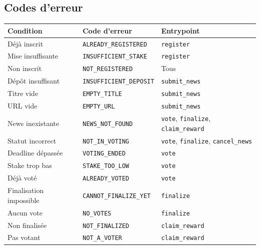 \documentclass[12pt,a4paper]{article}
\begin{document}
\subsection{Codes d'erreur}

\begin{table}[H]
\centering
\renewcommand{\arraystretch}{1.4}
\begin{tabular}{L{4.5cm} L{4.5cm} L{3.5cm}}
\toprule
{}
\textbf{Condition} & \textbf{Code d'erreur} & \textbf{Entrypoint} \\
\midrule
Déjà inscrit               & \texttt{ALREADY\_REGISTERED}   & \texttt{register} \\
Mise insuffisante          & \texttt{INSUFFICIENT\_STAKE}   & \texttt{register} \\
Non inscrit                & \texttt{NOT\_REGISTERED}       & Tous \\
Dépôt insuffisant          & \texttt{INSUFFICIENT\_DEPOSIT} & \texttt{submit\_news} \\
Titre vide                 & \texttt{EMPTY\_TITLE}          & \texttt{submit\_news} \\
URL vide                   & \texttt{EMPTY\_URL}            & \texttt{submit\_news} \\
News inexistante           & \texttt{NEWS\_NOT\_FOUND}      & \texttt{vote}, \texttt{finalize}, \texttt{claim\_reward} \\
Statut incorrect           & \texttt{NOT\_IN\_VOTING}       & \texttt{vote}, \texttt{finalize}, \texttt{cancel\_news} \\
Deadline dépassée          & \texttt{VOTING\_ENDED}         & \texttt{vote} \\
Stake trop bas             & \texttt{STAKE\_TOO\_LOW}       & \texttt{vote} \\
Déjà voté                  & \texttt{ALREADY\_VOTED}        & \texttt{vote} \\
Finalisation impossible    & \texttt{CANNOT\_FINALIZE\_YET} & \texttt{finalize} \\
Aucun vote                 & \texttt{NO\_VOTES}             & \texttt{finalize} \\
Non finalisée              & \texttt{NOT\_FINALIZED}        & \texttt{claim\_reward} \\
Pas votant                 & \texttt{NOT\_A\_VOTER}         & \texttt{claim\_reward} \\

\end{tabular}
\end{table}
\end{document}
